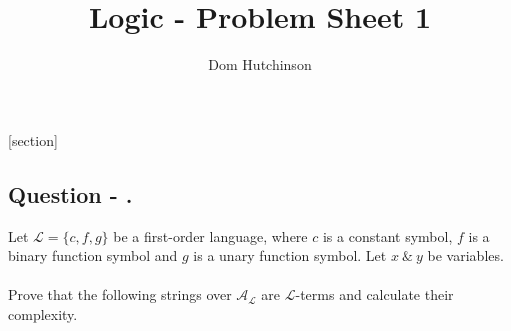\documentclass[11pt,a4paper]{article}
\begin{document}
\pagestyle{fancy}
\setlength\parindent{0pt}
\allowdisplaybreaks

\renewcommand{\headrulewidth}{0pt}

\title{Logic - Problem Sheet 1}
\author{Dom Hutchinson}
\maketitle

\fancyhead[R]{\today}

[section]

\newcommand{\dotprod}[0]{\boldsymbol{\cdot}}
\newcommand{\cosech}[0]{\mathrm{cosech}\ }
\newcommand{\cosec}[0]{\mathrm{cosec}\ }
\newcommand{\sech}[0]{\mathrm{sech}\ }
\newcommand{\prob}[0]{\mathbb{P}}
\newcommand{\nats}[0]{\mathbb{N}}
\newcommand{\cov}[0]{\mathrm{cov}}
\newcommand{\var}[0]{\mathrm{var}}
\newcommand{\expect}[0]{\mathbb{E}}
\newcommand{\reals}[0]{\mathbb{R}}
\newcommand{\integers}[0]{\mathbb{Z}}
\newcommand{\indicator}[0]{\mathds{1}}
\newcommand{\nb}[0]{\textit{N.B.} }
\newcommand{\ie}[0]{\textit{i.e.} }
\newcommand{\eg}[0]{\textit{e.g.} }
\newcommand{\iid}[0]{\overset{\text{iid}}{\sim} }
\newcommand{\x}[0]{\textbf{x} }
\newcommand{\X}[0]{\textbf{X} }
\newcommand{\LL}[0]{\mathcal{L}}

\newcommand{\qpart}[0]{\stepcounter{qpart} \textbf{Question \arabic{section} \alph{qpart})\\}}
\newcommand{\qpartnb}[0]{\stepcounter{qpart} \textbf{Question \arabic{section} \alph{qpart})} - }
\newcommand{\ans}[0]{ \textbf{Answer \arabic{section}\\}}
\newcommand{\apart}[0]{ \textbf{Answer \arabic{section} \alph{qpart})\\}}
\newcommand{\apartnb}[0]{ \textbf{Answer \arabic{section} \alph{qpart})} - }
\newcommand{\question}[0]{\stepcounter{section}\subsection*{Question - \arabic{section}.}}


{}
\question
Let $\LL=\{c,f,g\}$ be a first-order language, where $c$ is a constant symbol, $f$ is a binary function symbol and $g$ is a unary function symbol. Let $x\ \&\ y$ be variables.\\
\\
Prove that the following strings over $\mathcal{A_L}$ are $\LL$-terms and calculate their complexity.\\
\end{document}
